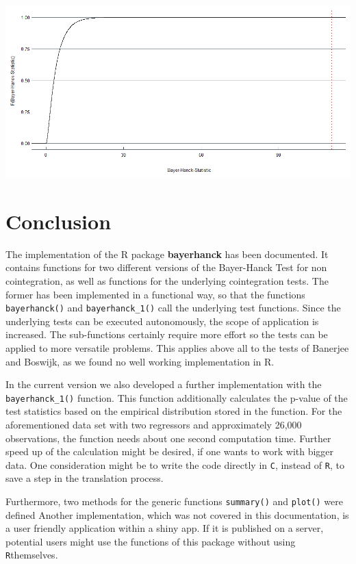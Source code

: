 \documentclass[11pt,a4paper]{article}
\let\origfigure\figure
\let\endorigfigure\endfigure
\renewenvironment{figure}[1][2] {
    \expandafter\origfigure\expandafter[H]
} {
    \endorigfigure
}
\begin{document}
\begin{figure}
\centering
\includegraphics{plot_bh.png}
\caption{Cumulative Distribution Function under \(\mathcal{H}_0\)}
\end{figure}

\hypertarget{conclusion}{%
\section{Conclusion}\label{conclusion}}

The implementation of the R package \textbf{bayerhanck} has been
documented. It contains functions for two different versions of the
Bayer-Hanck Test for non cointegration, as well as functions for the
underlying cointegration tests. The former has been implemented in a
functional way, so that the functions \texttt{bayerhanck()} and
\texttt{bayerhanck\_1()} call the underlying test functions. Since the
underlying tests can be executed autonomously, the scope of application
is increased. The sub-functions certainly require more effort so the
tests can be applied to more versatile problems. This applies above all
to the tests of Banerjee and Boswijk, as we found no well working
implementation in R.

In the current version we also developed a further implementation with
the \texttt{bayerhanck\_1()} function. This function additionally
calculates the p-value of the test statistics based on the empirical
distribution stored in the function. For the aforementioned data set
with two regressors and approximately 26,000 observations, the function
needs about one second computation time. Further speed up of the
calculation might be desired, if one wants to work with bigger data. One
consideration might be to write the code directly in \texttt{C}, instead
of \texttt{R}, to save a step in the translation process.

Furthermore, two methods for the generic functions \texttt{summary()}
and \texttt{plot()} were defined Another implementation, which was not
covered in this documentation, is a user friendly application within a
shiny app. If it is published on a server, potential users might use the
functions of this package without using \texttt{R}themselves.
\end{document}
